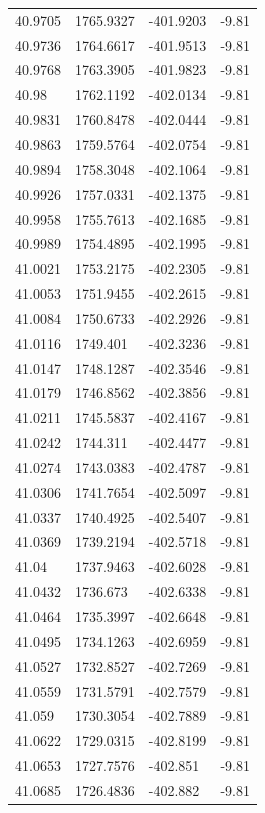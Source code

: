 \begin{table}[H]
\begin{tabular}{llll}
40.9705 & 1765.9327 & -401.9203 & -9.81 \\
40.9736 & 1764.6617 & -401.9513 & -9.81 \\
40.9768 & 1763.3905 & -401.9823 & -9.81 \\
40.98 & 1762.1192 & -402.0134 & -9.81 \\
40.9831 & 1760.8478 & -402.0444 & -9.81 \\
40.9863 & 1759.5764 & -402.0754 & -9.81 \\
40.9894 & 1758.3048 & -402.1064 & -9.81 \\
40.9926 & 1757.0331 & -402.1375 & -9.81 \\
40.9958 & 1755.7613 & -402.1685 & -9.81 \\
40.9989 & 1754.4895 & -402.1995 & -9.81 \\
41.0021 & 1753.2175 & -402.2305 & -9.81 \\
41.0053 & 1751.9455 & -402.2615 & -9.81 \\
41.0084 & 1750.6733 & -402.2926 & -9.81 \\
41.0116 & 1749.401 & -402.3236 & -9.81 \\
41.0147 & 1748.1287 & -402.3546 & -9.81 \\
41.0179 & 1746.8562 & -402.3856 & -9.81 \\
41.0211 & 1745.5837 & -402.4167 & -9.81 \\
41.0242 & 1744.311 & -402.4477 & -9.81 \\
41.0274 & 1743.0383 & -402.4787 & -9.81 \\
41.0306 & 1741.7654 & -402.5097 & -9.81 \\
41.0337 & 1740.4925 & -402.5407 & -9.81 \\
41.0369 & 1739.2194 & -402.5718 & -9.81 \\
41.04 & 1737.9463 & -402.6028 & -9.81 \\
41.0432 & 1736.673 & -402.6338 & -9.81 \\
41.0464 & 1735.3997 & -402.6648 & -9.81 \\
41.0495 & 1734.1263 & -402.6959 & -9.81 \\
41.0527 & 1732.8527 & -402.7269 & -9.81 \\
41.0559 & 1731.5791 & -402.7579 & -9.81 \\
41.059 & 1730.3054 & -402.7889 & -9.81 \\
41.0622 & 1729.0315 & -402.8199 & -9.81 \\
41.0653 & 1727.7576 & -402.851 & -9.81 \\
41.0685 & 1726.4836 & -402.882 & -9.81 \\

\end{tabular}
\end{table}
